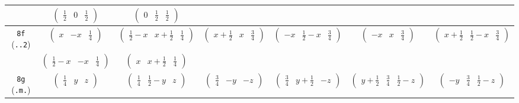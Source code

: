 \documentclass[fleqn,9pt,landscape]{jsarticle}
\begin{document}
\begin{center}
\begin{longtable}{ccccccc}
& $ \begin{pmatrix} \frac{1}{2} & 0 & \frac{1}{2} \end{pmatrix} $ & $ \begin{pmatrix} 0 & \frac{1}{2} & \frac{1}{2} \end{pmatrix} $ & $  $ & $  $ & $  $ & $  $ \\ \hline
{\tt 8f} ({\tt ..2}) & $ \begin{pmatrix} x & - x & \frac{1}{4} \end{pmatrix} $ & $ \begin{pmatrix} \frac{1}{2} - x & x + \frac{1}{2} & \frac{1}{4} \end{pmatrix} $ & $ \begin{pmatrix} x + \frac{1}{2} & x & \frac{3}{4} \end{pmatrix} $ & $ \begin{pmatrix} - x & \frac{1}{2} - x & \frac{3}{4} \end{pmatrix} $ & $ \begin{pmatrix} - x & x & \frac{3}{4} \end{pmatrix} $ & $ \begin{pmatrix} x + \frac{1}{2} & \frac{1}{2} - x & \frac{3}{4} \end{pmatrix} $ \\
& $ \begin{pmatrix} \frac{1}{2} - x & - x & \frac{1}{4} \end{pmatrix} $ & $ \begin{pmatrix} x & x + \frac{1}{2} & \frac{1}{4} \end{pmatrix} $ & $  $ & $  $ & $  $ & $  $ \\ \hline
{\tt 8g} ({\tt .m.}) & $ \begin{pmatrix} \frac{1}{4} & y & z \end{pmatrix} $ & $ \begin{pmatrix} \frac{1}{4} & \frac{1}{2} - y & z \end{pmatrix} $ & $ \begin{pmatrix} \frac{3}{4} & - y & - z \end{pmatrix} $ & $ \begin{pmatrix} \frac{3}{4} & y + \frac{1}{2} & - z \end{pmatrix} $ & $ \begin{pmatrix} y + \frac{1}{2} & \frac{3}{4} & \frac{1}{2} - z \end{pmatrix} $ & $ \begin{pmatrix} - y & \frac{3}{4} & \frac{1}{2} - z \end{pmatrix} $ \\

\end{longtable}
\end{center}
\end{document}
